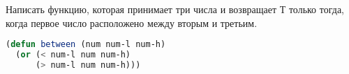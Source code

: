 Написать функцию, которая принимает три числа и возвращает Т только
тогда, когда первое число расположено между вторым и третьим.

\begin{lstlisting}[language=Lisp]
(defun between (num num-l num-h)
  (or (< num-l num num-h)
      (> num-l num num-h)))
\end{lstlisting}

